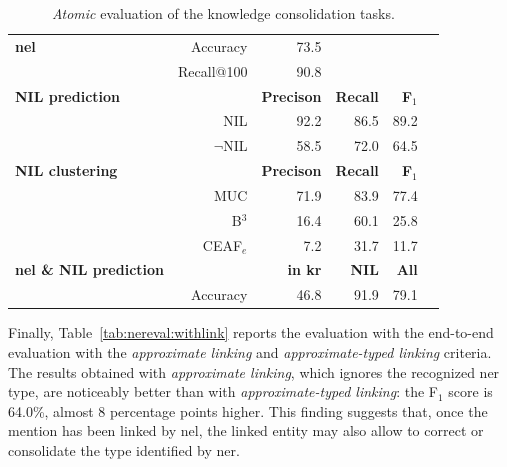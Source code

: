 \begin{table}[H]
    \centering
    \begin{tabular}{lr|rrrr}
        \toprule
        \textbf{\Acl{nel}} & Accuracy & 73.5 & & & \\
        & Recall@100 & 90.8 & & & \\
        \midrule
        \textbf{NIL prediction} & & \textbf{Precison} & \textbf{Recall} & \textbf{F$_1$} \\
        & NIL & 92.2 & 86.5 & 89.2 \\
        & $\neg$NIL & 58.5 & 72.0 & 64.5 \\
        \midrule
        \textbf{NIL clustering} & & \textbf{Precison} & \textbf{Recall} & \textbf{F$_1$} \\
        & MUC & 71.9 & 83.9 & 77.4 \\
        & B$^{3}$ & 16.4 & 60.1 & 25.8 \\
        & CEAF$_{e}$ & 7.2 & 31.7 & 11.7 \\
        \midrule
        \textbf{\Ac{nel} \& NIL prediction} & & \textbf{in \ac{kr}} & \textbf{NIL} & \textbf{All} \\
        & Accuracy & 46.8 & 91.9 & 79.1 \\
        \bottomrule
    \end{tabular}
    \caption{\textit{Atomic} evaluation of the knowledge consolidation tasks.}
    \label{tab:nereval:atomic}
\end{table}

Finally, Table~\ref{tab:nereval:withlink} reports the evaluation with the end-to-end evaluation with the \textit{approximate linking} and \textit{approximate-typed linking} criteria. The results obtained with \textit{approximate linking}, which ignores the recognized \ac{ner} type, are noticeably better than with \textit{approximate-typed linking}: the F$_1$ score is 64.0\%, almost 8 percentage points higher. This finding suggests that, once the mention has been linked by \ac{nel}, the linked entity may also allow to correct or consolidate the type identified by \ac{ner}.


